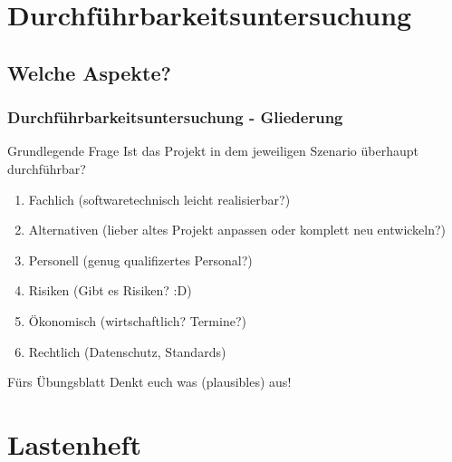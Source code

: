 \documentclass[18pt]{beamer}
\begin{document}
\section{Durchführbarkeitsuntersuchung}
	\subsection{Welche Aspekte?}
	\begin{frame}
		\frametitle{Durchführbarkeitsuntersuchung - Gliederung}
		\begin{block}{Grundlegende Frage}
			Ist das Projekt in dem jeweiligen Szenario überhaupt durchführbar?
		\end{block}
		\begin{enumerate}
			\item \pause Fachlich \pause (softwaretechnisch leicht realisierbar?) \pause
			\item Alternativen \pause (lieber altes Projekt anpassen oder komplett neu entwickeln?) \pause
			\item Personell \pause (genug qualifizertes Personal?) \pause
			\item Risiken \pause (Gibt es Risiken? :D) \pause
			\item Ökonomisch \pause (wirtschaftlich? Termine?) \pause
			\item Rechtlich \pause (Datenschutz, Standards)
		\end{enumerate}
		\pause
		\begin{alertblock}{Fürs Übungsblatt}
			Denkt euch was (plausibles) aus!
		\end{alertblock}
	\end{frame}

\section{Lastenheft}
\end{document}
